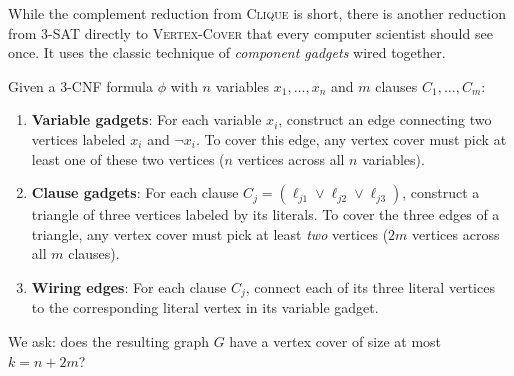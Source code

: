 While the complement reduction from \textsc{Clique} is short, there
is another reduction from \textsc{3-SAT} directly to \textsc{Vertex-Cover} that
every computer scientist should see once. It uses the classic technique of
\emph{component gadgets} wired together.

Given a 3-CNF formula $\phi$ with $n$ variables $x_1, \dots, x_n$ and $m$ clauses
$C_1, \dots, C_m$:
\begin{enumerate}
  \item \textbf{Variable gadgets}: For each variable $x_i$, construct an edge
        connecting two vertices labeled $x_i$ and $\neg x_i$. To cover this edge,
        any vertex cover must pick at least one of these two vertices ($n$
        vertices across all $n$ variables).
  \item \textbf{Clause gadgets}: For each clause $C_j = (\ell_{j1} \vee \ell_{j2}
        \vee \ell_{j3})$, construct a triangle of three vertices labeled by its
        literals. To cover the three edges of a triangle, any vertex cover must
        pick at least \emph{two} vertices ($2m$ vertices across all $m$
        clauses).
  \item \textbf{Wiring edges}: For each clause $C_j$, connect each of its three
        literal vertices to the corresponding literal vertex in its variable
        gadget.
\end{enumerate}
We ask: does the resulting graph $G$ have a vertex cover of size at most
$k = n + 2m$?

